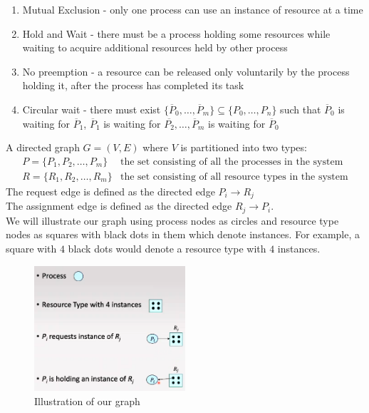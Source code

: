 \documentclass[a4paper]{article}
\theoremstyle{plain}
\theoremstyle{definition}
\newtheorem{defn}{Definition}[section]
\theoremstyle{remark}
\begin{document}
\begin{tcolorbox}[colback=black!3!white,colframe=black!60!white,title=\begin{defn}Necessary conditions for Deadlock \label{Necessary conditions for Deadlock}\end{defn}]
\begin{enumerate}
	\item Mutual Exclusion - only one process can use an instance of resource at a time
	\item Hold and Wait - there must be a process holding some resources while waiting to acquire additional resources held by other process
	\item No preemption - a resource can be released only voluntarily by the process holding it, after the process has completed its task
	\item Circular wait - there must exist $\{\overline{P}_0,\ldots,\overline{P}_m\} \subseteq \{P_0,\ldots,P_n\}$ such that $\overline{P}_0$ is waiting for $\overline{P}_1$, $\overline{P}_1$ is waiting for $\overline{P_2},\ldots,\overline{P}_m$ is waiting for $\overline{P}_0$
\end{enumerate}
\end{tcolorbox}
\begin{tcolorbox}[colback=black!3!white,colframe=black!60!white,title=\begin{defn}Resource Allocation Graph \label{Resource Allocation Graph}\end{defn}]
A directed graph $G=(V,E)$ where $V$ is partitioned into two types:
\begin{align*}
	P = \{P_1,P_2,\ldots,P_m\} & \text{the set consisting of all the processes in the system}\\
	R = \{R_1,R_2,\ldots,R_m\} & \text{the set consisting of all resource types in the system}
\end{align*}
The request edge is defined as the directed edge $P_i \to R_j$ \\
The assignment edge is defined as the directed edge $R_j \to  P_i$. \\
We will illustrate our graph using process nodes as circles and resource type nodes as squares with black dots in them which denote instances. For example, a square with $4$ black dots would denote a resource type with $4$ instances. 
\begin{figure}[H]
	\centering
	\includegraphics[width=0.5\textwidth]{sixtyseven.png}
	\caption{Illustration of our graph}
	\label{fig:sixtyseven-png}
\end{figure}
\end{tcolorbox}
\end{document}
